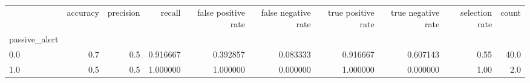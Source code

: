 \begin{tabular}{lrrrrrrrrr}
\toprule
{} &  accuracy &  precision &    recall &  false positive rate &  false negative rate &  true positive rate &  true negative rate &  selection rate &  count \\
passive\_alert &           &            &           &                      &                      &                     &                     &                 &        \\
\midrule
0.0           &       0.7 &        0.5 &  0.916667 &             0.392857 &             0.083333 &            0.916667 &            0.607143 &            0.55 &   40.0 \\
1.0           &       0.5 &        0.5 &  1.000000 &             1.000000 &             0.000000 &            1.000000 &            0.000000 &            1.00 &    2.0 \\
\bottomrule
\end{tabular}
